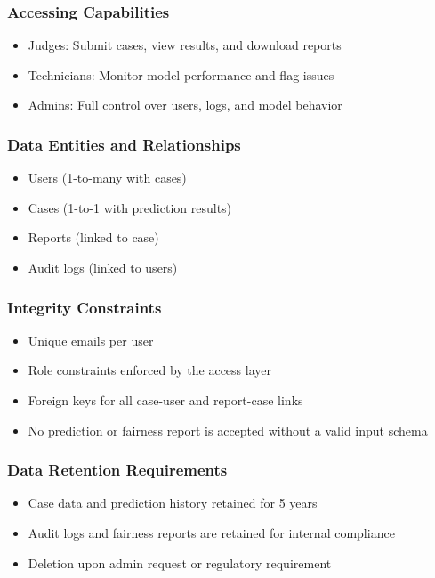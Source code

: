 \documentclass[12pt]{article}
\begin{document}
\subsubsection{Accessing Capabilities}
\begin{itemize}
    \item Judges: Submit cases, view results, and download reports
    \item Technicians: Monitor model performance and flag issues
    \item Admins: Full control over users, logs, and model behavior
\end{itemize}

\subsubsection{Data Entities and Relationships}
\begin{itemize}
    \item Users (1-to-many with cases)
    \item Cases (1-to-1 with prediction results)
    \item Reports (linked to case)
    \item Audit logs (linked to users)
\end{itemize}

\subsubsection{Integrity Constraints}
\begin{itemize}
    \item Unique emails per user
    \item Role constraints enforced by the access layer
    \item Foreign keys for all case-user and report-case links
    \item No prediction or fairness report is accepted without a valid input schema
\end{itemize}

\subsubsection{Data Retention Requirements}
\begin{itemize}
    \item Case data and prediction history retained for 5 years
    \item Audit logs and fairness reports are retained for internal compliance
    \item Deletion upon admin request or regulatory requirement
\end{itemize}
\end{document}
